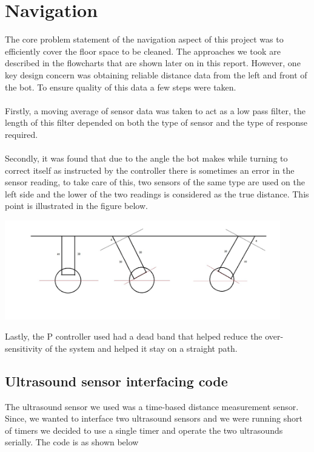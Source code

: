 \documentclass[12pt]{article}
\begin{document}
\section{Navigation}
The core problem statement of the navigation aspect of this project was to efficiently cover the floor space to be cleaned. The approaches we took are described in the flowcharts that are shown later on in this report. However, one key design concern was obtaining reliable distance data from the left and front of the bot. To ensure quality of this data a few steps were taken. \\ \\
Firstly, a moving average of sensor data was taken to act as a low pass filter, the length of this filter depended on both the type of sensor and the type of response required. \\ \\
Secondly, it was found that due to the angle the bot makes while turning to correct itself as instructed by the controller there is sometimes an error in the sensor reading, to take care of this, two sensors of the same type are used on the left side and the lower of the two readings is considered as the true distance. This point is illustrated in the figure below.

\begin{center}
\includegraphics[width=0.9\textwidth]{9.jpg}
\end{center}
 
\noindent Lastly, the P controller used had a dead band that helped reduce the over-sensitivity of the system and helped it stay on a straight path. 

\subsection{Ultrasound sensor interfacing code}
The ultrasound sensor we used was a time-based distance measurement sensor. Since, we wanted to interface two ultrasound sensors and we were running short of timers we decided to use a single timer and operate the two ultrasounds serially. The code is as shown below\\
\end{document}
